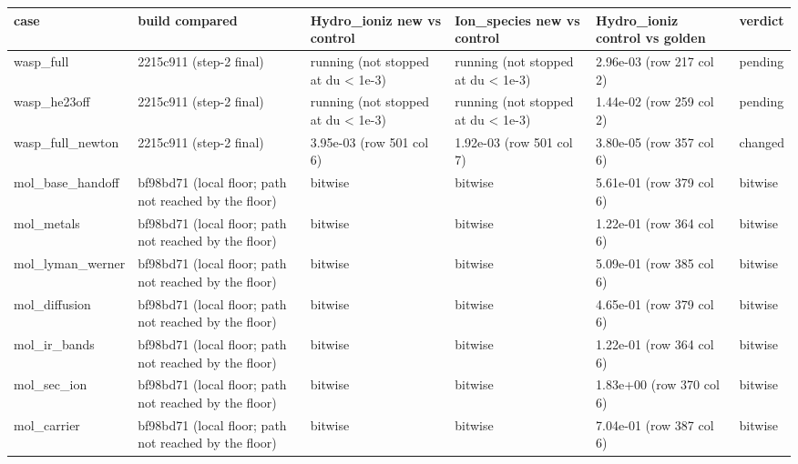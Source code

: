 \documentclass[english,a4paper]{my_memo}
\begin{document}
{\def\LTcaptype{none} %
{\small
\begin{longtable}[]{@{}>{\raggedright\arraybackslash}p{\dimexpr(\linewidth-12\tabcolsep)/6\relax}>{\raggedright\arraybackslash}p{\dimexpr(\linewidth-12\tabcolsep)/6\relax}>{\raggedright\arraybackslash}p{\dimexpr(\linewidth-12\tabcolsep)/6\relax}>{\raggedright\arraybackslash}p{\dimexpr(\linewidth-12\tabcolsep)/6\relax}>{\raggedright\arraybackslash}p{\dimexpr(\linewidth-12\tabcolsep)/6\relax}>{\raggedright\arraybackslash}p{\dimexpr(\linewidth-12\tabcolsep)/6\relax}@{}}
\toprule\noalign{}
case & build compared & Hydro\_ioniz new vs control & Ion\_species new vs control & Hydro\_ioniz control vs golden & verdict \\
\midrule\noalign{}
\endhead
\bottomrule\noalign{}
\endlastfoot
wasp\_full & 2215c911 (step-2 final) & running (not stopped at du \textless{} 1e-3) & running (not stopped at du \textless{} 1e-3) & 2.96e-03 (row 217 col 2) & pending \\
wasp\_he23off & 2215c911 (step-2 final) & running (not stopped at du \textless{} 1e-3) & running (not stopped at du \textless{} 1e-3) & 1.44e-02 (row 259 col 2) & pending \\
wasp\_full\_newton & 2215c911 (step-2 final) & 3.95e-03 (row 501 col 6) & 1.92e-03 (row 501 col 7) & 3.80e-05 (row 357 col 6) & changed \\
mol\_base\_handoff & bf98bd71 (local floor; path not reached by the floor) & bitwise & bitwise & 5.61e-01 (row 379 col 6) & bitwise \\
mol\_metals & bf98bd71 (local floor; path not reached by the floor) & bitwise & bitwise & 1.22e-01 (row 364 col 6) & bitwise \\
mol\_lyman\_werner & bf98bd71 (local floor; path not reached by the floor) & bitwise & bitwise & 5.09e-01 (row 385 col 6) & bitwise \\
mol\_diffusion & bf98bd71 (local floor; path not reached by the floor) & bitwise & bitwise & 4.65e-01 (row 379 col 6) & bitwise \\
mol\_ir\_bands & bf98bd71 (local floor; path not reached by the floor) & bitwise & bitwise & 1.22e-01 (row 364 col 6) & bitwise \\
mol\_sec\_ion & bf98bd71 (local floor; path not reached by the floor) & bitwise & bitwise & 1.83e+00 (row 370 col 6) & bitwise \\
mol\_carrier & bf98bd71 (local floor; path not reached by the floor) & bitwise & bitwise & 7.04e-01 (row 387 col 6) & bitwise \\

\end{longtable}}}
\end{document}
